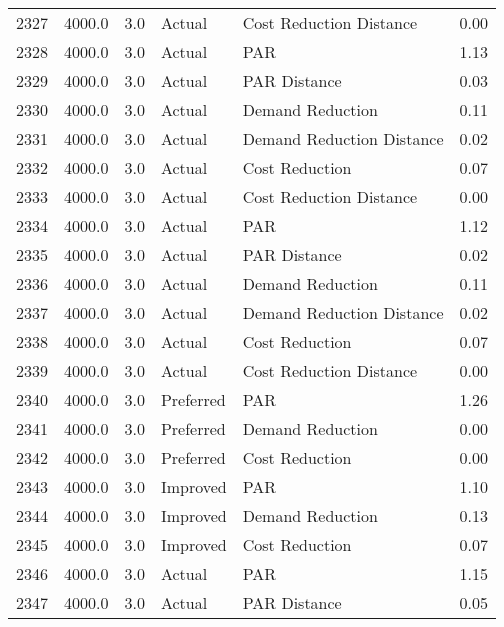 \begin{longtable}{lrrllr}
2327 &       4000.0 &     3.0 &         Actual &    Cost Reduction Distance &   0.00 \\
2328 &       4000.0 &     3.0 &         Actual &                        PAR &   1.13 \\
2329 &       4000.0 &     3.0 &         Actual &               PAR Distance &   0.03 \\
2330 &       4000.0 &     3.0 &         Actual &           Demand Reduction &   0.11 \\
2331 &       4000.0 &     3.0 &         Actual &  Demand Reduction Distance &   0.02 \\
2332 &       4000.0 &     3.0 &         Actual &             Cost Reduction &   0.07 \\
2333 &       4000.0 &     3.0 &         Actual &    Cost Reduction Distance &   0.00 \\
2334 &       4000.0 &     3.0 &         Actual &                        PAR &   1.12 \\
2335 &       4000.0 &     3.0 &         Actual &               PAR Distance &   0.02 \\
2336 &       4000.0 &     3.0 &         Actual &           Demand Reduction &   0.11 \\
2337 &       4000.0 &     3.0 &         Actual &  Demand Reduction Distance &   0.02 \\
2338 &       4000.0 &     3.0 &         Actual &             Cost Reduction &   0.07 \\
2339 &       4000.0 &     3.0 &         Actual &    Cost Reduction Distance &   0.00 \\
2340 &       4000.0 &     3.0 &      Preferred &                        PAR &   1.26 \\
2341 &       4000.0 &     3.0 &      Preferred &           Demand Reduction &   0.00 \\
2342 &       4000.0 &     3.0 &      Preferred &             Cost Reduction &   0.00 \\
2343 &       4000.0 &     3.0 &       Improved &                        PAR &   1.10 \\
2344 &       4000.0 &     3.0 &       Improved &           Demand Reduction &   0.13 \\
2345 &       4000.0 &     3.0 &       Improved &             Cost Reduction &   0.07 \\
2346 &       4000.0 &     3.0 &         Actual &                        PAR &   1.15 \\
2347 &       4000.0 &     3.0 &         Actual &               PAR Distance &   0.05 \\

\end{longtable}

